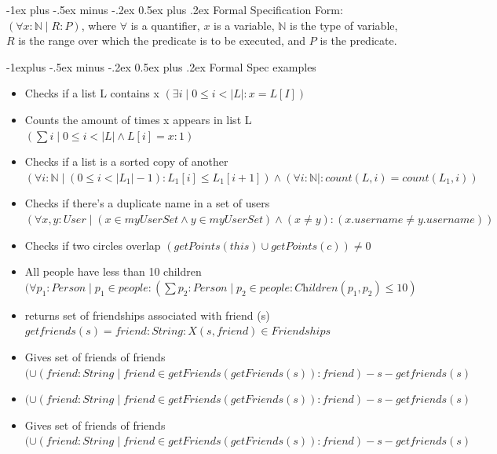 \documentclass[letterpaper, 8pt]{extarticle}
\makeatletter
\renewcommand{\section}{\@startsection{section}{1}{0mm}%
                                {-1ex plus -.5ex minus -.2ex}%
                                {0.5ex plus .2ex}%
                                {\normalfont\normalsize\bfseries}}
\renewcommand{\subsection}{\@startsection{subsection}{2}{0mm}%
                                {-1explus -.5ex minus -.2ex}%
                                {0.5ex plus .2ex}%
                                {\normalfont\small\bfseries}}
\makeatother
\begin{document}
\begin{multicols*}{5}
  \section{Formal Specification}
  Form: $(\forall x : \mathbb{N} \mid R : P)$,
  where $\forall$ is a quantifier, $x$ is a variable, $\mathbb{N}$ is the type of variable,
  $R$ is the range over which the predicate is to be executed, and $P$ is the predicate.

  \subsection{Formal Spec examples}
  \begin{itemize}
  \setlength\itemsep{0.9em}
    \item Checks if a list L contains x
    $(\exists i \mid 0 \leq i < |L| : x = L [I])$
    \item Counts the amount of times x appears in list L
    $(\sum i \mid 0 \leq i < |L| \land L[i] = x: 1)$
    \item Checks if a list is a sorted copy of another
    $(\forall i: \mathbb{N} \mid (0 \leq i < |L_1| - 1): L_1[i] \leq L_1[i + 1]) \land (\forall i : \mathbb{N}|: count(L, i) = count(L_1, i))$
    \item Checks if there's a duplicate name in a set of users
    $(\forall x,y: User \mid (x \in myUserSet \land y \in myUserSet) \land (x \neq y) : (x.username \neq y.username))$
    \item Checks if two circles overlap
    $(getPoints(this) \cup getPoints(c)) \neq 0$
    \item All people have less than 10 children
    $(\forall p_1 : Person \mid p_1 \in people : (\sum p_2 : Person \mid p_2 \in people: \textit{Children}(p_1, p_2) \leq 10)$
    \item returns set of friendships associated with friend (s)
    $ getfriends(s) = {friend:String:X(s,friend)\in Friendships}$
    \item Gives set of friends of friends
    $(\cup (friend : String \mid friend \in getFriends(getFriends(s)) : friend)-{s}-getfriends(s)$
    \item
    $(\cup (friend : String \mid friend \in getFriends(getFriends(s)) : friend)-{s}-getfriends(s)$
    \item Gives set of friends of friends
    $(\cup (friend : String \mid friend \in getFriends(getFriends(s)) : friend)-{s}-getfriends(s)$
    \end{itemize}

\end{multicols*}
\end{document}
